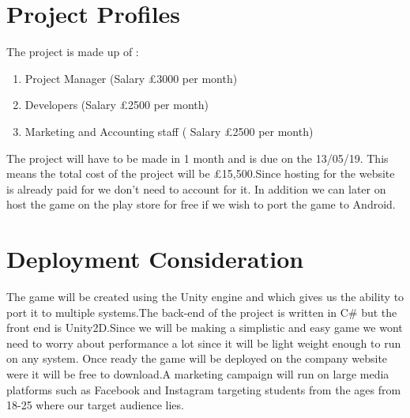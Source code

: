 \section{Project Profiles}
The project is made up of :
\begin{enumerate}
	\item Project Manager (Salary £3000 per month)
	\item Developers  (Salary £2500 per month)
	\item Marketing and Accounting staff ( Salary £2500 per month)
\end{enumerate}
The project will have to be made in 1 month and is due on the 13/05/19.
This means the total cost of the project will be £15,500.Since hosting for the website is already paid for we don't need to account for it. In addition we can later on host the game on the play store for free if we wish to port the game to Android.
\section{Deployment Consideration}
The game will be created using the Unity engine and which gives us the ability to port it to multiple systems.The back-end of the project is written in C\# but the front end is Unity2D.Since we will be making a simplistic and easy game we wont need to worry about performance a lot since it will be light weight enough to run on any system.
\newline
Once ready the game will be deployed on the company website were it will be free to download.A marketing campaign will run on large media platforms such as Facebook and Instagram targeting students from the ages from 18-25 where our target audience lies.

